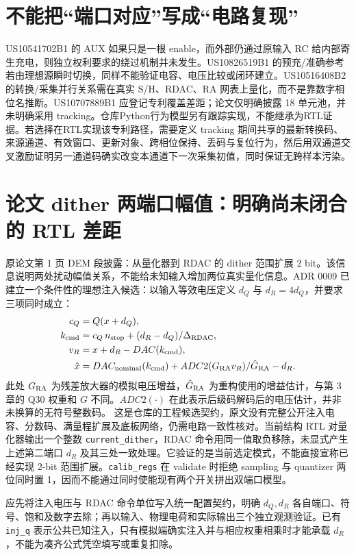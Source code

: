 \documentclass[UTF8,fontset=fandol,11pt,a4paper,openany]{ctexrep}
\newcommand{\code}[1]{\nolinkurl{#1}}
\begin{document}
\section{不能把“端口对应”写成“电路复现”}
US10541702B1 的 AUX 如果只是一根 enable，而外部仍通过原输入 RC 给内部寄生充电，则独立权利要求的绕过机制并未发生。US10826519B1 的预充/准确参考若由理想源瞬时切换，同样不能验证电容、电压比较或闭环建立。US10516408B2 的转换/采集并行关系需在真实 S/H、RDAC、RA 网表上量化，而不是靠数字相位名推断。US10707889B1 应登记专利覆盖差距；论文仅明确披露 18 单元池，并未明确采用 tracking。仓库Python行为模型另有跟踪实现，不能继承为RTL证据。若选择在RTL实现该专利路径，需要定义 tracking 期间共享的最新转换码、来源通道、有效窗口、更新对象、跨相位保持、丢码与复位行为，然后用双通道交叉激励证明另一通道码确实改变本通道下一次采集初值，同时保证无跨样本污染。


\section{论文 dither 两端口幅值：明确尚未闭合的 RTL 差距}
原论文第 1 页 DEM 段披露：从量化器到 RDAC 的 dither 范围扩展 2 bit。该信息说明两处扰动幅值关系，不能给未知输入增加两位真实量化信息。ADR 0009 已建立一个条件性的理想注入候选：以输入等效电压定义 \(d_Q\) 与 \(d_R=4d_Q\)，并要求三项同时成立：
\begin{align}
c_Q&=Q(x+d_Q),\\
k_{\rm cmd}&=c_Q\,n_{\rm step}+(d_R-d_Q)/\Delta_{\rm RDAC},\\
v_R&=x+d_R-DAC(k_{\rm cmd}),\\
\hat{x}&=DAC_{\rm nominal}(k_{\rm cmd})+ADC2(G_{\rm RA}v_R)/\hat{G}_{\rm RA}-d_R.
\end{align}
此处 \(G_{\rm RA}\) 为残差放大器的模拟电压增益，\(\hat{G}_{\rm RA}\) 为重构使用的增益估计，与第 3 章的 Q30 权重和 \(G\) 不同。\(ADC2(\cdot)\) 在此表示后级码解码后的电压估计，并非未换算的无符号整数码。
这是仓库的工程候选契约，原文没有完整公开注入电容、分数码、满量程扩展及底板网络，仍需电路一致性核对。当前结构 RTL 对量化器输出一个整数 \code{current_dither}，RDAC 命令用同一值取负移除，未显式产生上述第二端口 \(d_R\) 及其三处一致处理。它验证的是当前选定模式，不能直接宣称已经实现 2-bit 范围扩展。\code{calib_regs} 在 validate 时拒绝 sampling 与 quantizer 两位同时置 1，因而不能通过同时使能现有两个开关拼出双端口模型。

应先将注入电压与 RDAC 命令单位写入统一配置契约，明确 \(d_Q,d_R\) 各自端口、符号、饱和及数字去除；再以输入、物理电荷和实际输出三个独立观测验证。已有 \code{inj_q} 表示公共已知注入，只有模拟端确实注入并与相应权重相乘时才能承载 \(d_R\)，不能为凑齐公式凭空填写或重复扣除。
\end{document}

